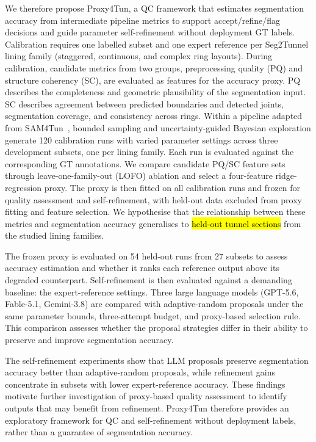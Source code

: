 \documentclass[a4paper,fleqn]{cas-dc}
\begin{document}
{We therefore propose Proxy4Tun, a QC framework that estimates segmentation accuracy from intermediate pipeline metrics to support accept/refine/flag decisions and guide parameter self-refinement without deployment GT labels. Calibration requires one labelled subset and one expert reference per Seg2Tunnel lining family (staggered, continuous, and complex ring layouts). During calibration, candidate metrics from two groups, preprocessing quality (PQ) and structure coherency (SC), are evaluated as features for the accuracy proxy. PQ describes the completeness and geometric plausibility of the segmentation input. SC describes agreement between predicted boundaries and detected joints, segmentation coverage, and consistency across rings. Within a pipeline adapted from SAM4Tun~\cite{ye2025sam4tun}, bounded sampling and uncertainty-guided Bayesian exploration generate 120 calibration runs with varied parameter settings across three development subsets, one per lining family. Each run is evaluated against the corresponding GT annotations. We compare candidate PQ/SC feature sets through leave-one-family-out (LOFO) ablation and select a four-feature ridge-regression proxy. The proxy is then fitted on all calibration runs and frozen for quality assessment and self-refinement, with held-out data excluded from proxy fitting and feature selection. We hypothesise that the relationship between these metrics and segmentation accuracy generalises to \hl{held-out tunnel sections} from the studied lining families.

The frozen proxy is evaluated on 54 held-out runs from 27 subsets to assess accuracy estimation and whether it ranks each reference output above its degraded counterpart. Self-refinement is then evaluated against a demanding baseline: the expert-reference settings. Three large language models (GPT-5.6, Fable-5.1, Gemini-3.8) are compared with adaptive-random proposals under the same parameter bounds, three-attempt budget, and proxy-based selection rule. This comparison assesses whether the proposal strategies differ in their ability to preserve and improve segmentation accuracy.

The self-refinement experiments show that LLM proposals preserve segmentation accuracy better than adaptive-random proposals, while refinement gains concentrate in subsets with lower expert-reference accuracy. These findings motivate further investigation of proxy-based quality assessment to identify outputs that may benefit from refinement. Proxy4Tun therefore provides an exploratory framework for QC and self-refinement without deployment labels, rather than a guarantee of segmentation accuracy.

}
\end{document}
